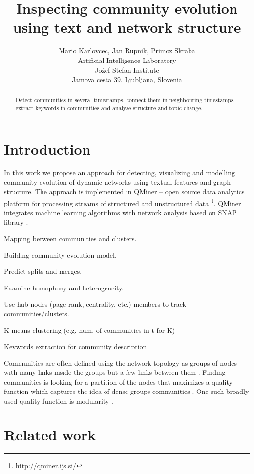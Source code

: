 \documentclass{article} %
\title{Inspecting community evolution using text and network structure}
\author{
Mario Karlovcec, Jan Rupnik, Primoz Skraba \\
Artificial Intelligence Laboratory\\
Jožef Stefan Institute\\
Jamova cesta 39, Ljubljana, Slovenia \\
}
\begin{document}
\maketitle

\begin{abstract}
Detect communities in several timestamps, connect them in neighbouring timestamps, extract keywords in communities and analyse structure and topic change.
\end{abstract}

\section{Introduction}

In this work we propose an approach for detecting, visualizing and modelling community evolution of dynamic networks using textual features and graph structure. The approach is implemented in QMiner – open source data analytics platform for processing streams of structured and unstructured data \footnote{http://qminer.ijs.si/}. QMiner integrates machine learning algorithms with network analysis based on SNAP library \cite{snap}.

Mapping between communities and clusters.

Building community evolution model.

Predict splits and merges.

Examine homophony and heterogeneity.

Use hub nodes (page rank, centrality, etc.) members to track communities/clusters.

K-means clustering (e.g. num. of communities in t for K)

Keywords extraction for community description

Communities are often defined using the network topology as groups of nodes with many links inside the groups but a few links between them . Finding communities is looking for a partition of the nodes that maximizes a quality function which captures the idea of dense groups communities \cite{aynaud}. One such broadly used quality function is modularity \cite{newman2003}.

\section{Related work}
\end{document}

